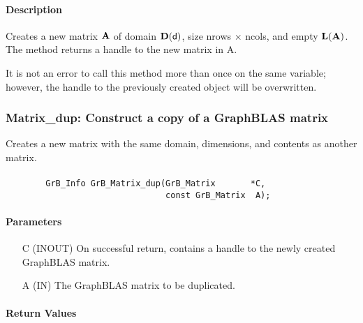 \paragraph{Description}

Creates a new matrix ${\bf A}$ of domain $\mathbf{D}({\sf d})$, size 
{\sf nrows $\times$ ncols}, and empty $\mathbf{L}({\bf A})$. The method returns a
handle to the new matrix in {\sf A}.

It is not an error to call this method more than once on the same variable;  
however, the handle to the previously created object will be overwritten. 


\subsubsection{{\sf Matrix\_dup}: Construct a copy of a GraphBLAS matrix}

Creates a new matrix with the same domain, dimensions, and contents as 
another matrix.

\paragraph{\syntax}

\begin{verbatim}
        GrB_Info GrB_Matrix_dup(GrB_Matrix       *C,
                                const GrB_Matrix  A);
\end{verbatim}

\paragraph{Parameters}

\begin{itemize}[leftmargin=1.1in]
    \item[{\sf C}] ({\sf INOUT}) On successful return, contains a handle to 
                                 the newly created GraphBLAS matrix.
    \item[{\sf A}] ({\sf IN})    The GraphBLAS matrix to be duplicated.
\end{itemize}


\paragraph{Return Values}

